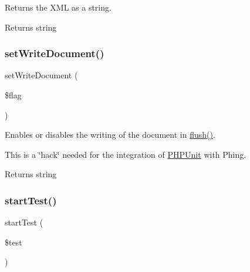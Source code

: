 Returns the X\+ML as a string.

\begin{DoxyReturn}{Returns}
string 
\end{DoxyReturn}
\mbox{\label{class_p_h_p_unit___util___log___j_unit_a0d177b0430978fd7abd8a067b6f612a7}} 
\subsubsection{\texorpdfstring{set\+Write\+Document()}{setWriteDocument()}}
{\footnotesize\ttfamily set\+Write\+Document (\begin{DoxyParamCaption}\item[{}]{\$flag }\end{DoxyParamCaption})}

Enables or disables the writing of the document in \mbox{\hyperlink{class_p_h_p_unit___util___log___j_unit_a7751f77b5263bcf940ece6e824a05b38}{flush()}}.

This is a \char`\"{}hack\char`\"{} needed for the integration of \mbox{\hyperlink{namespace_p_h_p_unit}{P\+H\+P\+Unit}} with Phing.

\begin{DoxyReturn}{Returns}
string 
\end{DoxyReturn}
\mbox{\label{class_p_h_p_unit___util___log___j_unit_a1a9bddc54f26bb3fb5c2ec9778ea5198}} 
\subsubsection{\texorpdfstring{start\+Test()}{startTest()}}
{\footnotesize\ttfamily start\+Test (\begin{DoxyParamCaption}\item[{\mbox{\hyperlink{interface_p_h_p_unit___framework___test}{P\+H\+P\+Unit\+\_\+\+Framework\+\_\+\+Test}}}]{\$test }\end{DoxyParamCaption})}

